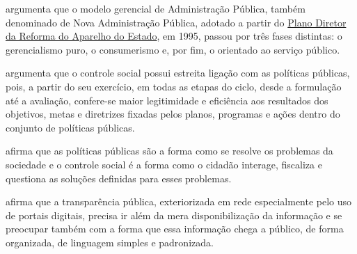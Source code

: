 \cite{tavares2022governo} argumenta que o modelo gerencial de Administração Pública, também denominado de Nova Administração Pública, adotado a partir do \href{https://www.biblioteca.presidencia.gov.br/publicacoes-oficiais/catalogo/fhc/plano-diretor-da-reforma-do-aparelho-do-estado-1995.pdf}{Plano Diretor da Reforma do Aparelho do Estado}, em 1995, passou por três fases distintas: o gerencialismo puro, o consumerismo e, por fim, o orientado ao serviço público.

\cite{tavares2022governo} argumenta que o controle social possui estreita ligação com as políticas públicas, pois, a partir do seu exercício, em todas as etapas do ciclo, desde a formulação até a avaliação, confere-se maior legitimidade e eficiência aos resultados dos objetivos, metas e diretrizes fixadas pelos planos, programas e ações dentro do conjunto de políticas públicas.

\cite{tavares2022governo} afirma que as políticas públicas são a forma como se resolve os problemas da sociedade e o controle social é a forma como o cidadão interage, fiscaliza e questiona as soluções definidas para esses problemas. 

\cite{tavares2022governo} afirma que a transparência pública, exteriorizada em rede especialmente pelo uso de portais digitais, precisa ir além da mera disponibilização da informação e se preocupar também com a forma que essa informação chega a público, de forma organizada, de linguagem simples e padronizada.
